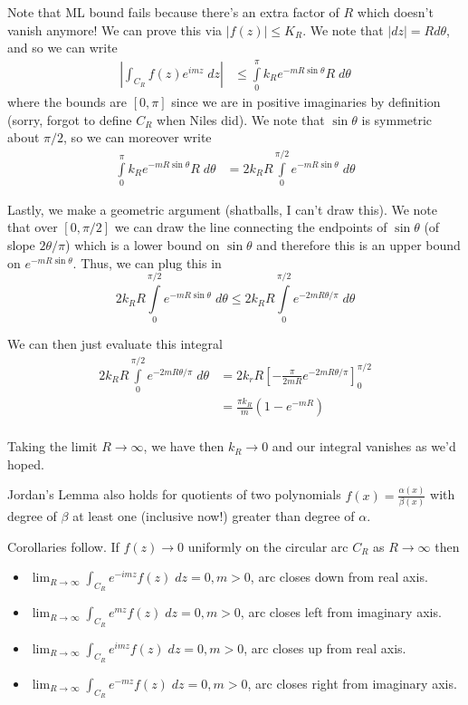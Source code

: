\documentclass[10pt]{report}
\newcommand{\abs}[1]{\left|#1\right|}
\begin{document}
Note that ML bound fails because there's an extra factor of $R$ which doesn't vanish anymore! We can prove this via $\abs{f(z)} \leq K_R$. We note that $\abs{dz} = Rd\theta$, and so we can write
\begin{align*}
    \abs{\int_{C_R} f(z) e^{imz}\; dz} &\leq \displaystyle\int\limits_{0}^{\pi}k_R e^{-mR\sin \theta}R\;d\theta
\end{align*}
where the bounds are $[0,\pi]$ since we are in positive imaginaries by definition (sorry, forgot to define $C_R$ when Niles did). We note that $\sin \theta$ is symmetric about $\pi/2$, so we can moreover write
\begin{align*}
    \displaystyle\int\limits_{0}^{\pi}k_R e^{-mR\sin \theta}R\;d\theta &= 2k_R R\displaystyle\int\limits_{0}^{\pi/2}e^{-mR\sin \theta}\;d\theta
\end{align*}

Lastly, we make a geometric argument (shatballs, I can't draw this). We note that over $[0,\pi/2]$ we can draw the line connecting the endpoints of $\sin \theta$ (of slope $2\theta/\pi$) which is a lower bound on $\sin \theta$ and therefore this is an upper bound on $e^{-mR\sin \theta}$. Thus, we can plug this in
$$2k_R R\displaystyle\int\limits_{0}^{\pi/2}e^{-mR\sin \theta}\;d\theta \leq 2k_R R\displaystyle\int\limits_{0}^{\pi/2}e^{-2mR\theta/\pi}\;d\theta$$

We can then just evaluate this integral
\begin{align*}
    2k_R R\displaystyle\int\limits_{0}^{\pi/2}e^{-2mR\theta/\pi}\;d\theta &= 2k_rR \left[ -\frac{\pi}{2mR}e^{-2mR\theta/\pi} \right]_0^{\pi/2}\\
    &= \frac{\pi k_R}{m}\left( 1-e^{-mR} \right)\\
\end{align*}

Taking the limit $R \to \infty$, we have then $k_R \to 0$ and our integral vanishes as we'd hoped.

Jordan's Lemma also holds for quotients of two polynomials $f(x) = \frac{\alpha(x)}{\beta(x)}$ with degree of $\beta$ at least one (inclusive now!) greater than degree of $\alpha$. 

Corollaries follow. If $f(z) \to 0$ uniformly on the circular arc $C_R$ as $R \to \infty$ then
\begin{itemize}
    \item $\lim_{R \to \infty}\int_{C_R}e^{-imz}f(z) \; dz = 0, m > 0$, arc closes down from real axis.
    \item $\lim_{R \to \infty} \int_{C_R}e^{mz}f(z) \; dz = 0, m > 0$, arc closes left from imaginary axis.
    \item $\lim_{R \to \infty}\int_{C_R}e^{imz}f(z) \; dz = 0, m > 0$, arc closes up from real axis.
    \item $\lim_{R \to \infty} \int_{C_R}e^{-mz}f(z) \; dz = 0, m > 0$, arc closes right from imaginary axis.
\end{itemize}
\end{document}
